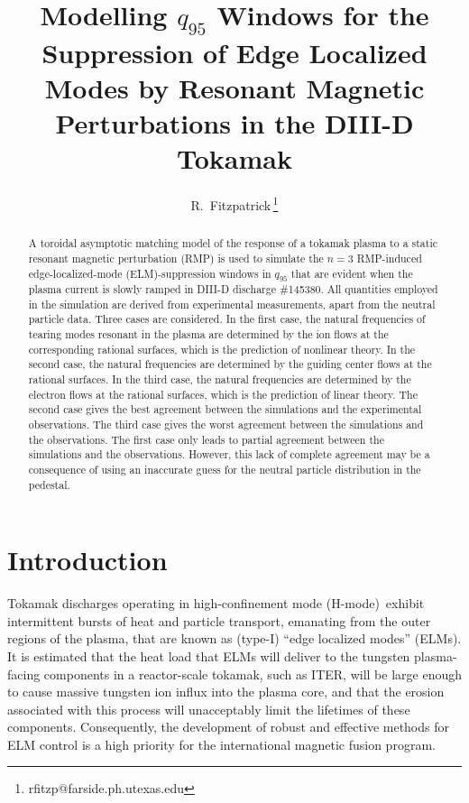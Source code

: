 \documentclass[12pt,prb,aps]{revtex4-1}
\begin{document}
\title {Modelling $q_{95}$ Windows for the Suppression of Edge Localized Modes by Resonant Magnetic Perturbations in the DIII-D Tokamak}

\author{R.~Fitzpatrick\,\footnote{rfitzp@farside.ph.utexas.edu}}

\begin{abstract}
A toroidal asymptotic matching model of the response of a tokamak plasma to a static resonant magnetic perturbation (RMP) is used to simulate the $n=3$ RMP-induced 
edge-localized-mode (ELM)-suppression
windows in $q_{95}$ that are evident when the plasma current is slowly ramped in DIII-D discharge \#145380. All quantities employed in the simulation are
derived from experimental measurements, apart from the neutral particle data. 
Three cases are considered.
In the first case, the natural frequencies of tearing modes resonant in the plasma are 
determined by the ion flows at the corresponding rational surfaces, which is the prediction of nonlinear theory.
In the second case, the natural frequencies are 
determined by the guiding center flows at the rational surfaces.
 In the third case, the natural frequencies   are 
determined by the electron flows at the  rational surfaces, which is the prediction of linear theory.
The second case gives  the best agreement between the simulations and the  experimental observations.   The third case gives the worst agreement between the simulations 
and the  observations. The first case only leads to partial agreement between  the  simulations and the  observations. However, this lack of complete agreement
may be a consequence of using an inaccurate guess for the neutral particle distribution in the pedestal.  
\end{abstract}
 
\maketitle

\section{Introduction}
Tokamak discharges operating in high-confinement mode (H-mode)\,\cite{wagner} exhibit intermittent bursts of heat and particle transport, 
emanating from the outer regions of the plasma, that are known as  (type-I) ``edge localized modes'' (ELMs).\cite{zohm}
It is estimated that the heat load that ELMs
will deliver to the tungsten plasma-facing components in a reactor-scale tokamak, such as ITER, will be large enough to cause
massive tungsten ion influx into the plasma core, and that the erosion associated with this process will 
unacceptably limit the lifetimes of these components.\cite{loarte} Consequently, the development of robust and effective
methods for ELM control is a high priority for the international magnetic fusion program. 
\end{document}
